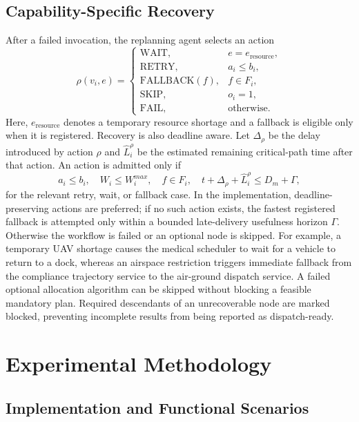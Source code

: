 \documentclass[conference]{IEEEtran}
\begin{document}
\subsection{Capability-Specific Recovery}

After a failed invocation, the replanning agent selects an action
\begin{equation}
\rho(v_i,e)=
\begin{cases}
\mathrm{WAIT}, & e=e_{\mathrm{resource}},\\
\mathrm{RETRY}, & a_i\leq b_i,\\
\mathrm{FALLBACK}(f), & f\in F_i,\\
\mathrm{SKIP}, & o_i=1,\\
\mathrm{FAIL}, & \text{otherwise}.
\end{cases}
\label{eq:recovery}
\end{equation}
Here, $e_{\mathrm{resource}}$ denotes a temporary resource shortage and a
fallback is eligible only when it is registered. Recovery is also deadline
aware. Let $\Delta_{\rho}$ be the delay introduced by action $\rho$ and
$\hat{L}_i^{\rho}$ be the estimated remaining critical-path time after that
action. An action is admitted only if
\begin{equation}
a_i\leq b_i,\quad W_i\leq W_i^{max},\quad
f\in F_i,\quad
t+\Delta_{\rho}+\hat{L}_i^{\rho}\leq D_m+\Gamma ,
\label{eq:recoveryguard}
\end{equation}
for the relevant retry, wait, or fallback case. In the implementation,
deadline-preserving actions are preferred; if no such action exists, the
fastest registered fallback is attempted only within a bounded late-delivery
usefulness horizon $\Gamma$. Otherwise the workflow is failed or an optional
node is skipped. For example, a temporary UAV shortage causes the medical scheduler to wait
for a vehicle to return to a dock, whereas an airspace restriction triggers
immediate fallback from the compliance trajectory service to the air-ground
dispatch service. A failed optional allocation algorithm can be skipped
without blocking a feasible mandatory plan. Required descendants of an
unrecoverable node are marked blocked, preventing incomplete results from
being reported as dispatch-ready.

\section{Experimental Methodology}

\subsection{Implementation and Functional Scenarios}
\end{document}

